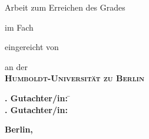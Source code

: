 \makeatletter
\begin{titlepage}
\doublespacing\centering%
\textbf{\Huge\sffamily \@title}\vskip 2.5mm

\textbf{\Large\sffamily \@subtitle}\vfill

{\large Arbeit zum Erreichen des Grades}\\
\textbf{\Large\sffamily\degreevar}\vfill

{\large im Fach}\\
\resizebox{%
      \ifdim\width>\textwidth
        \textwidth
      \else
        \width
      \fi
    }{!}{%
    \textbf{\Large\sffamily\programmevar}}\vfill

{\large eingereicht von}\\
\resizebox{%
      \ifdim\width>\textwidth
        \textwidth
      \else
        \width
      \fi
    }{!}{%
    \textbf{\Large\sffamily \@author}}\vfill

{\large an der}\\
\textbf{\Large\scshape\sffamily Humboldt-Universität zu Berlin}\vfill

\resizebox{%
      \ifdim\width>\textwidth
        \textwidth
      \else
        \width
      \fi
    }{!}{%
    \textbf{\Large\scshape\sffamily\facultyvar}}

\resizebox{%
      \ifdim\width>\textwidth
        \textwidth
      \else
        \width
      \fi
    }{!}{%
    \textbf{\Large\scshape\sffamily\institutevar}}\vfill

\parbox{0cm}{\large%
    \begin{tabbing}
        \textbf{. Gutachter/in:} \= \firstsupervisorvar\\
        \textbf{. Gutachter/in:} \> \secondsupervisorvar
    \end{tabbing}
}\vfill


\enlargethispage{16mm}\textbf{\large\sffamily Berlin, \@date}
\end{titlepage}
\makeatother